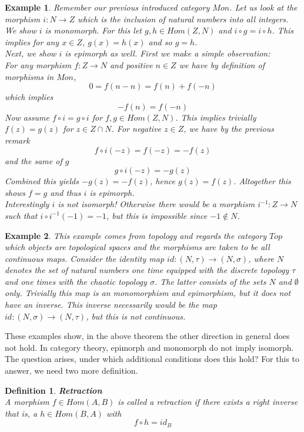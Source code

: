 \documentclass[17pt]{extarticle}
\newtheorem{example}{Example}
\newtheorem{definition}{Definition}
\begin{document}
\begin{example}
	Remember our previous introduced category $Mon$. Let us look at the morphism $i:N\rightarrow Z$
	which is the inclusion of natural numbers into all integers.
	We show $i$ is monomorph. For this let $g,h\in Hom(Z,N)$ and $i\circ g=i\circ h$.
	This implies for any $x\in Z$, $g(x)=h(x)$ and so $g=h$.\\
	Next, we show $i$ is epimorph as well. First we make a simple observation:\\
	For any morphism $f:Z\rightarrow N$ and positive $n\in Z$ we have by definition of morphisms in $Mon$,\\
	$$0=f(n-n)=f(n)+f(-n)$$
	which implies 
	$$-f(n)=f(-n)$$
	Now assume $f\circ i =g\circ i$ for $f,g\in Hom(Z,N)$. This implies trivially $f(z)=g(z)$ for $z\in Z\cap N$.
	For negative $z\in Z$, we have by the previous remark
	$$f\circ i(-z)=f(-z)=-f(z)$$
	and the same of $g$
	$$g\circ i(-z)=-g(z)$$
	Combined this yields $-g(z)=-f(z)$, hence $g(z)=f(z)$.
	Altogether this shows $f=g$ and thus $i$ is epimorph.\\
	Interestingly $i$ is not isomorph! Otherwise there would be a morphism $i^{-1}:Z\rightarrow N$
	such that $i\circ i^{-1}(-1)=-1$, but this is impossible since $-1\notin N$.	
\end{example}

\begin{example}
	This example comes from topology and regards the category $Top$ which objects are topological spaces and the morphisms are taken to be all continuous maps. Consider the identity map $id: (N, \tau)\rightarrow (N,\sigma)$, where $N$ denotes the set of natural numbers one time equipped with the discrete topology $\tau$ and one times with the chaotic topology $\sigma$. The latter consists of the sets $N$ and $\emptyset$ only. Trivially this map is an monomorphism and epimorphism, but it does not have an inverse. This inverse necessarily would be the map  $id: (N, \sigma)\rightarrow (N,\tau)$, but this is not continuous.
\end{example}

These examples show, in the above theorem the other direction in general does not hold.
In category theory, epimorph and monomorph do not imply isomorph.
The question arises, under which additional conditions does this hold?
For this to answer, we need two more definition.

\begin{definition}
	\textbf{Retraction}\\
	A morphism $f\in Hom(A,B)$ is called a retraction if there exists a right inverse that is,
	a $h\in Hom(B,A)$ with
	$$f\circ h=id_B$$
\end{definition}
\end{document}
